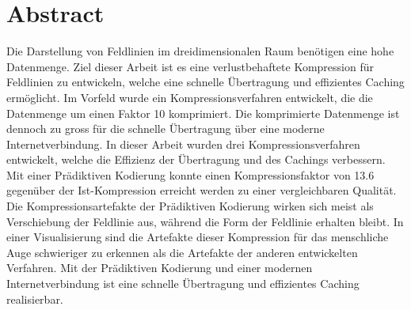 \section*{Abstract}
Die Darstellung von Feldlinien im dreidimensionalen Raum benötigen eine hohe Datenmenge. Ziel dieser Arbeit ist es eine verlustbehaftete Kompression für Feldlinien zu entwickeln, welche eine schnelle Übertragung und effizientes Caching ermöglicht. Im Vorfeld wurde ein Kompressionsverfahren entwickelt, die die Datenmenge um einen Faktor 10 komprimiert. Die komprimierte Datenmenge ist dennoch zu gross für die schnelle Übertragung über eine moderne Internetverbindung. In dieser Arbeit wurden drei Kompressionsverfahren entwickelt, welche die Effizienz der Übertragung und des Cachings verbessern. Mit einer Prädiktiven Kodierung konnte einen Kompressionsfaktor von 13.6  gegenüber der Ist-Kompression erreicht werden zu einer vergleichbaren Qualität. Die Kompressionsartefakte der Prädiktiven Kodierung wirken sich meist als Verschiebung der Feldlinie aus, während die Form der Feldlinie erhalten bleibt. In einer Visualisierung sind die Artefakte dieser Kompression für das menschliche Auge schwieriger zu erkennen als die Artefakte der anderen entwickelten Verfahren. Mit der Prädiktiven Kodierung und einer modernen Internetverbindung ist eine schnelle Übertragung und effizientes Caching realisierbar.
